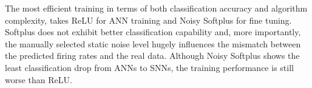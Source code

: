 \documentclass{article}
\begin{document}
	
	
	
	
	The most efficient training in terms of both classification accuracy and algorithm complexity, takes ReLU for ANN training and Noisy Softplus for fine tuning.
	Softplus does not exhibit better classification capability and, more importantly, the manually selected static noise level hugely influences the mismatch between the predicted firing rates and the real data.
	Although Noisy Softplus shows the least classification drop from ANNs to SNNs, the training performance is still worse than ReLU.
	
\end{document}
